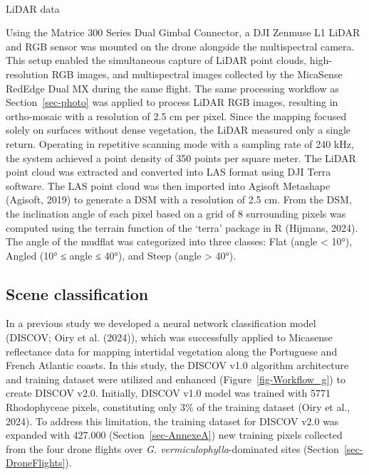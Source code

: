 \documentclass[
  letterpaper,
  11pt,
  english,
  singlespacing,
  headsepline]{MastersDoctoralThesis}
\makeatletter
\let\oldparagraph\paragraph
\renewcommand{\paragraph}{
    \@ifstar
      \xxxParagraphStar
      \xxxParagraphNoStar
  }
\newcommand{\xxxParagraphStar}[1]{\oldparagraph*{#1}\mbox{}}
\newcommand{\xxxParagraphNoStar}[1]{\oldparagraph{#1}\mbox{}}
\makeatother
\begin{document}
\begin{spacing}{1.5}
\paragraph{LiDAR data}\label{lidar-data}

Using the Matrice 300 Series Dual Gimbal Connector, a DJI Zenmuse L1
LiDAR and RGB sensor was mounted on the drone alongside the
multispectral camera. This setup enabled the simultaneous capture of
LiDAR point clouds, high-resolution RGB images, and multispectral images
collected by the MicaSense RedEdge Dual MX during the same flight. The
same processing workflow as Section~\ref{sec-photo} was applied to
process LiDAR RGB images, resulting in ortho-mosaic with a resolution of
2.5 cm per pixel. Since the mapping focused solely on surfaces without
dense vegetation, the LiDAR measured only a single return. Operating in
repetitive scanning mode with a sampling rate of 240 kHz, the system
achieved a point density of 350 points per square meter. The LiDAR point
cloud was extracted and converted into LAS format using DJI Terra
software. The LAS point cloud was then imported into Agisoft Metashape
(Agisoft, 2019) to generate a DSM with a resolution of 2.5 cm. From the
DSM, the inclination angle of each pixel based on a grid of 8
surrounding pixels was computed using the terrain function of the
`terra' package in R (Hijmans, 2024). The angle of the mudflat was
categorized into three classes: Flat (angle \textless{} 10°), Angled
(10° ≤ angle ≤ 40°), and Steep (angle \textgreater{} 40°).

\subsection{Scene classification}\label{scene-classification}

In a previous study we developed a neural network classification model
(DISCOV; Oiry et al. (2024)), which was successfully applied to
Micasense reflectance data for mapping intertidal vegetation along the
Portuguese and French Atlantic coasts. In this study, the DISCOV v1.0
algorithm architecture and training dataset were utilized and enhanced
(Figure~\ref{fig-Workflow_g}) to create DISCOV v2.0. Initially, DISCOV
v1.0 model was trained with 5771 Rhodophyceae pixels, constituting only
3\% of the training dataset (Oiry et al., 2024). To address this
limitation, the training dataset for DISCOV v2.0 was expanded with
427.000 (Section~\ref{sec-AnnexeA}) new training pixels collected from
the four drone flights over \emph{G. vermiculophylla}-dominated sites
(Section~\ref{sec-DroneFlights}).


\end{spacing}
\end{document}
